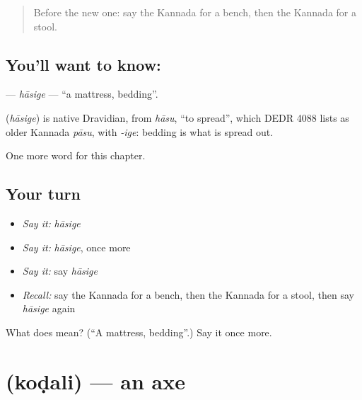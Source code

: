 \label{lesson:KA-C190-hasige}



\begin{quote}
Before the new one: say the Kannada for a bench, then the Kannada for a stool.
\end{quote}

\subsection*{You'll want to know: }
\textbf{} — \emph{hāsige} — \textquotedblleft{}a mattress, bedding\textquotedblright{}.

\begin{cousinweb}
\textbf{} (\emph{hāsige}) is native Dravidian, from \emph{hāsu}, \textquotedblleft{}to spread\textquotedblright{}, which DEDR 4088 lists as older Kannada \emph{pāsu}, with \emph{-ige}: bedding is what is spread out.
\end{cousinweb}

\begin{grammarlens}[title={What you've built}]
One more word for this chapter.
\end{grammarlens}

\subsection*{Your turn}
\begin{itemize}
\raggedright
  \item \emph{Say it:} \emph{hāsige}
  \item \emph{Say it:} \emph{hāsige}, once more
  \item \emph{Say it:} say \emph{hāsige}
  \item \emph{Recall:} say the Kannada for a bench, then the Kannada for a stool, then say \emph{hāsige} again
\end{itemize}

\begin{tcolorbox}[breakable,colback=teal!4,colframe=teal!35!black,title={Before you move on}]
What does  mean? (\textquotedblleft{}A mattress, bedding\textquotedblright{}.) Say it once more.
\end{tcolorbox}
\section[\texorpdfstring{\kn{ಕೊಡಲಿ} (koḍali)}{ಕೊಡಲಿ (koḍali)}]{ (koḍali) — an axe}

